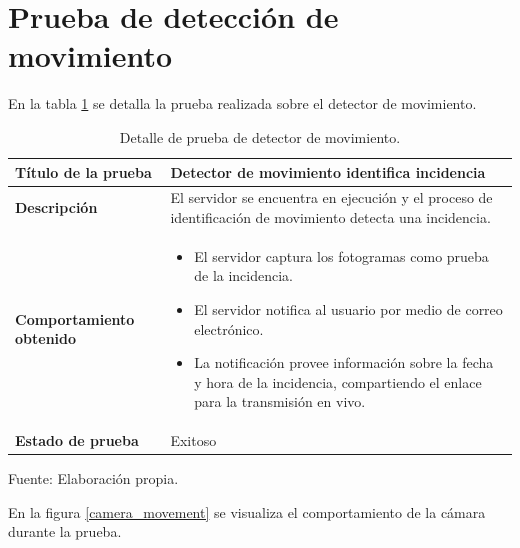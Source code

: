 \section{Prueba de detección de movimiento}

En la tabla \ref{table_movement_detection} se detalla la prueba realizada sobre el detector de movimiento.\\

\begin{table}[H]
    \caption{Detalle de prueba de detector de movimiento.}
    \begin{center}
        \begin{tabular}{|>{\centering}p{}|m{}<{\centering}|} 
            \hline
            \textbf{Título de la prueba} & \textbf{Detector de movimiento identifica incidencia} \\
            \hline
            \textbf{Descripción} & El servidor se encuentra en ejecución y el proceso de identificación de movimiento detecta una incidencia.\\
            \hline
            \textbf{Comportamiento obtenido} & 
            \begin{itemize}
                \item El servidor captura los fotogramas como prueba de la incidencia.
                \item El servidor notifica al usuario por medio de correo electrónico.
                \item La notificación provee información sobre la fecha y hora de la incidencia, compartiendo el enlace para la transmisión en vivo.
            \end{itemize} \\ 
            \hline
            \textbf{Estado de prueba} & Exitoso \\
            \hline
        \end{tabular}
    \end{center}
    \begin{center}
        Fuente: Elaboración propia.
        \label{table_movement_detection}
    \end{center}
\end{table}

En la figura \ref{camera_movement} se visualiza el comportamiento de la cámara durante la prueba.

